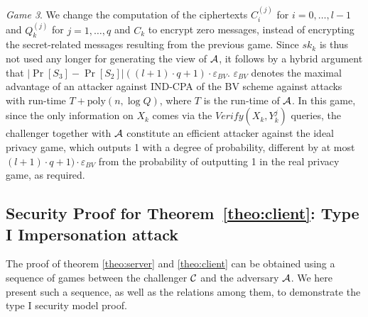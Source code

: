 \textit{Game 3}. We change the computation of the ciphertexts $C^{(j)}_i$ for $i=0,\ldots,l-1$ and $Q^{(j)}_k$ for
$j=1,\ldots,q$ and $C_k$ to encrypt zero messages, instead of encrypting the secret-related messages resulting from the previous
game. Since $sk_k$ is thus not used any longer for generating the view of $\mathcal{A}$, it follows by a hybrid argument that
$|\Pr[S_3]-\Pr[S_2]| ((l+1) \cdot q + 1) \cdot \varepsilon_{BV}$. $\varepsilon_{BV}$ denotes the maximal advantage
of an attacker against IND-CPA of the BV scheme against attacks with run-time $T + \mathrm{poly}(n, \log Q)$, where $T$ is
the run-time of $\mathcal{A}$.  In this game, since the only information on $X_k$ comes via the $Verify(X_k,Y_k^{j})$
queries, the challenger together with $\mathcal{A}$ constitute an efficient attacker against the ideal privacy game, which
outputs 1 with a degree of probability, different by at most $(l+1) \cdot q + 1) \cdot \varepsilon_{BV}$ from the probability of
outputting 1 in the real privacy game, as required.

\subsection{Security Proof for Theorem~\ref{theo:client}: Type I Impersonation attack}
The proof of theorem \ref{theo:server} and \ref{theo:client} can be obtained using a sequence of games between the
challenger $\mathcal{C}$ and the adversary $\mathcal{A}$. We here present such a sequence, as well as the relations among
them, to demonstrate the type I security model proof.

